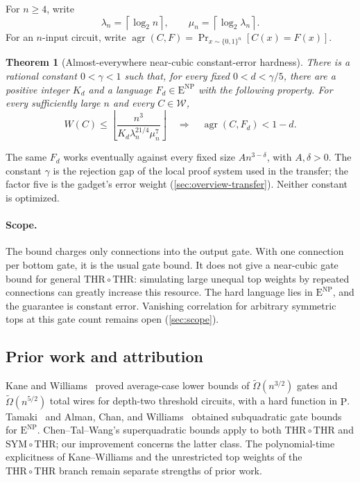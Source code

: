 \documentclass[11pt,letterpaper]{article}
\newtheorem{theorem}{Theorem}[section]
\theoremstyle{definition}
\theoremstyle{remark}
\newcommand{\THR}{\mathrm{THR}}
\newcommand{\SYM}{\mathrm{SYM}}
\newcommand{\ENP}{\mathrm{E}^{\mathrm{NP}}}
\newcommand{\ceil}[1]{\left\lceil #1\right\rceil}
\newcommand{\floor}[1]{\left\lfloor #1\right\rfloor}
\newcommand{\cW}{\mathcal W}
\newcommand{\lgx}{\log_2}
\begin{document}
For \(n\ge4\), write
\[
 \lambda_n=\ceil{\lgx n},\qquad
 \mu_n=\ceil{\lgx\lambda_n}.
\]
For an \(n\)-input circuit, write
\(\operatorname{agr}(C,F)=\Pr_{x\sim\{0,1\}^n}[C(x)=F(x)]\).

\begin{theorem}[Almost-everywhere near-cubic constant-error hardness]
\label{thm:main}\label{thm:gadget-fixed-error}
There is a rational constant \(0<\gamma<1\) such that, for every
fixed \(0<d<\gamma/5\), there are a positive integer \(K_d\)
and a language \(F_d\in\ENP\) with the following property.
For every sufficiently large \(n\) and every \(C\in\cW\),
\[
 \boxed{\quad
 W(C)\le\floor{\frac{n^3}{K_d\lambda_n^{21/4}\mu_n^7}}
 \quad\Longrightarrow\quad
 \operatorname{agr}(C,F_d)<1-d .
 \quad}
\]
\end{theorem}

The same \(F_d\) works eventually against every fixed size
\(A n^{3-\delta}\), with \(A,\delta>0\). The constant \(\gamma\)
is the rejection gap of the local proof system used in the transfer;
the factor five is the gadget's error weight
(\cref{sec:overview-transfer}). Neither constant is optimized.

\paragraph{Scope.}
The bound charges only connections into the output gate. With one
connection per bottom gate, it is the usual gate bound. It does not
give a near-cubic gate bound for general \(\THR\circ\THR\): simulating
large unequal top weights by repeated connections can greatly increase
this resource. The hard language lies in \(\ENP\), and the guarantee
is constant error. Vanishing correlation for arbitrary symmetric tops
at this gate count remains open (\cref{sec:scope}).

\subsection{Prior work and attribution}\label{sec:background}\label{sec:related}

Kane and Williams~\cite{KW16} proved average-case lower bounds of
\(\widetilde\Omega(n^{3/2})\) gates and
\(\widetilde\Omega(n^{5/2})\) total wires for depth-two threshold
circuits, with a hard function in \(\mathrm P\). Tamaki~\cite{Tam16}
and Alman, Chan, and Williams~\cite{ACW16} obtained subquadratic gate
bounds for \(\ENP\). Chen--Tal--Wang's superquadratic bounds apply
to both \(\THR\circ\THR\) and \(\SYM\circ\THR\); our improvement
concerns the latter class. The polynomial-time explicitness of
Kane--Williams and the unrestricted top weights of the
\(\THR\circ\THR\) branch remain separate strengths of prior work.
\end{document}
